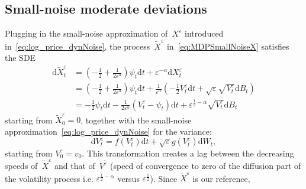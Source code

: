\documentclass{amsart}[11pt]
\numberwithin{equation}{section}
\numberwithin{theorem}{subsection}
\numberwithin{proposition}{subsection}
\numberwithin{definition}{subsection}
\numberwithin{lemma}{subsection}
\numberwithin{assumption}{subsection}
\newcommand{\D}{\mathrm{d}}
\newcommand{\eps}{\varepsilon}
\newcommand{\seps}{\sqrt{\eps}}
\newcommand{\half}{\frac{1}{2}}
\begin{document}
\subsection{Small-noise moderate deviations}
Plugging in the small-noise approximation of~$X^\eps$ introduced in~\eqref{eq:log_price_dynNoise}, the process~$\widetilde{X}^\eps$ in~\eqref{eq:MDPSmallNoiseX} satisfies the SDE
\begin{align*}
\D \widetilde{X}^\eps_t
 & = \displaystyle\left(-\frac{1}{2} + \frac{1}{2\eps^{\alpha}}\right)\psi_t\D t
+ \eps^{-\alpha}\D X^{\eps}_t\\
 & = \displaystyle\left(-\frac{1}{2} + \frac{1}{2\eps^{\alpha}}\right)\psi_t\D t
+ \frac{1}{\eps^{\alpha}}\left(-\frac{1}{2}V_t^\eps \D t + \seps\sqrt{V_t^\eps} \D B_t\right)\\
 & = \displaystyle
 -\frac{1}{2}\psi_t\D t - \frac{1}{2\eps^{\alpha}}
 \left(V_t^\eps - \psi_t\right) \D t + 
\eps^{\half-\alpha}\sqrt{V_t^\eps} \D B_t
\end{align*}
starting from $\widetilde{X}^{\eps}_0 = 0$,
together with the small-noise approximation~\eqref{eq:log_price_dynNoise} for the variance:
$$
\D V_t^{\eps} = \displaystyle  f(V_t^{\eps})\D t + \seps g(V_t^{\eps})\D W_t,
$$
starting from $V_0^{\eps} = v_0$.
This transformation creates a lag between the decreasing speeds of~$\widetilde{X}^{\eps}$ and that of~$V^{\widetilde{\eps}}$ (speed of convergence to zero of the diffusion part of the volatility process i.e. $\eps^{\frac{1}{2} - \alpha}$ versus $\eps^{\frac{1}{2}}$). Since $\widetilde{X}^{\eps}$ is our reference, %
\end{document}
